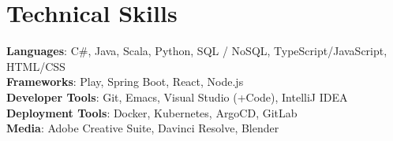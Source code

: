 \documentclass[letterpaper,11pt]{article}
\begin{document}
%
\section{Technical Skills}
 \begin{itemize}[leftmargin=0.15in, label={}]
    \small{\item{
     \textbf{Languages}{: C\#, Java, Scala, Python, SQL / NoSQL, TypeScript/JavaScript, HTML/CSS } \\
     \textbf{Frameworks}{: Play, Spring Boot, React, Node.js } \\
     \textbf{Developer Tools}{: Git, Emacs, Visual Studio (+Code), IntelliJ IDEA} \\
     \textbf{Deployment Tools}{: Docker, Kubernetes, ArgoCD, GitLab } \\
     \textbf{Media}{: Adobe Creative Suite, Davinci Resolve, Blender}
    }}
 \end{itemize}


\end{document}
